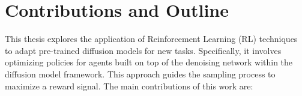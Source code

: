
\section{Contributions and Outline}


This thesis explores the application of Reinforcement Learning (RL) techniques to adapt pre-trained diffusion models for new tasks. Specifically, it involves optimizing policies for agents built on top of the denoising network within the diffusion model framework. This approach guides the sampling process to maximize a reward signal. The main contributions of this work are: \\


